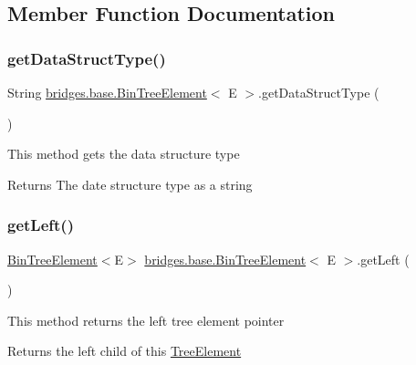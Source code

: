\subsection{Member Function Documentation}
\hypertarget{classbridges_1_1base_1_1_bin_tree_element_a60fa936692e168f70fb8567090c98883}{}\label{classbridges_1_1base_1_1_bin_tree_element_a60fa936692e168f70fb8567090c98883} 
\subsubsection{\texorpdfstring{get\+Data\+Struct\+Type()}{getDataStructType()}}
{\footnotesize\ttfamily String \hyperlink{classbridges_1_1base_1_1_bin_tree_element}{bridges.\+base.\+Bin\+Tree\+Element}$<$ E $>$.get\+Data\+Struct\+Type (\begin{DoxyParamCaption}{ }\end{DoxyParamCaption})}

This method gets the data structure type

\begin{DoxyReturn}{Returns}
The date structure type as a string 
\end{DoxyReturn}
\hypertarget{classbridges_1_1base_1_1_bin_tree_element_aeb6fd894af8e158c9c48dd0749d1bd22}{}\label{classbridges_1_1base_1_1_bin_tree_element_aeb6fd894af8e158c9c48dd0749d1bd22} 
\subsubsection{\texorpdfstring{get\+Left()}{getLeft()}}
{\footnotesize\ttfamily \hyperlink{classbridges_1_1base_1_1_bin_tree_element}{Bin\+Tree\+Element}$<$E$>$ \hyperlink{classbridges_1_1base_1_1_bin_tree_element}{bridges.\+base.\+Bin\+Tree\+Element}$<$ E $>$.get\+Left (\begin{DoxyParamCaption}{ }\end{DoxyParamCaption})}

This method returns the left tree element pointer \begin{DoxyReturn}{Returns}
the left child of this \hyperlink{classbridges_1_1base_1_1_tree_element}{Tree\+Element} 
\end{DoxyReturn}
\hypertarget{classbridges_1_1base_1_1_bin_tree_element_aa3855c26617ada7248a9d4f83cf455b7}{}\label{classbridges_1_1base_1_1_bin_tree_element_aa3855c26617ada7248a9d4f83cf455b7} 
